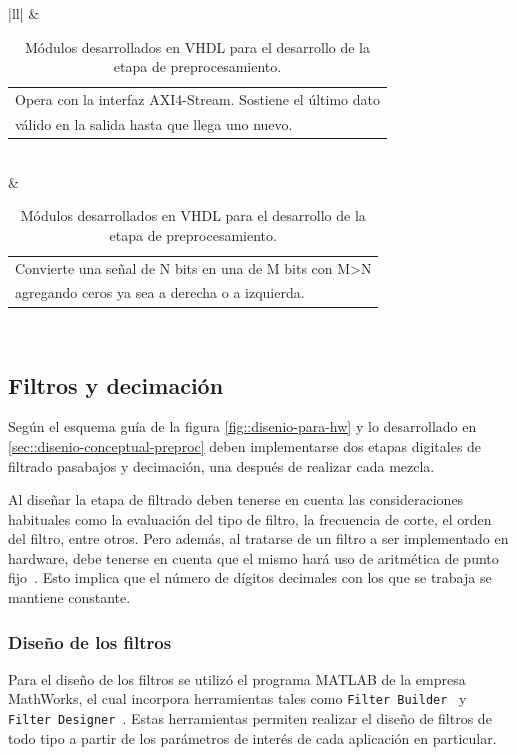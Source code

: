 \documentclass[../../main.tex]{subfiles}
\begin{document}
\begin{table}[H]
{\begin{tabular}{|ll|}
           & \begin{tabular}[c]{@{}l@{}}Opera con la interfaz AXI4-Stream. Sostiene el último dato\\ válido en la salida hasta que llega uno nuevo.\end{tabular}                                                                                                                                                                      \\ \hline
                                                           & \begin{tabular}[c]{@{}l@{}}Convierte una señal de N bits en una de M bits con M\textgreater{}N\\ agregando ceros ya sea a derecha o a izquierda.\end{tabular}                                                                                                                                                            \\ \hline
    \end{tabular}%
    }
    \caption{Módulos desarrollados en VHDL para el desarrollo de la etapa de preprocesamiento.}
    \label{tab::ip-fran}
    \end{table}

\subsection{Filtros y decimación}\label{subsec::filtros-decimacion}
Según el esquema guía de la figura \ref{fig::disenio-para-hw} y lo desarrollado en \ref{sec::disenio-conceptual-preproc} deben implementarse dos etapas digitales de filtrado pasabajos y decimación, una después de realizar cada mezcla. 

Al diseñar la etapa de filtrado deben tenerse en cuenta las consideraciones habituales como la evaluación del tipo de filtro, la frecuencia de corte, el orden del filtro, entre otros. Pero además, al tratarse de un filtro a ser implementado en hardware, debe tenerse en cuenta que el mismo hará uso de aritmética de punto fijo~\cite{pto-fijo}. Esto implica que el número de dígitos decimales con los que se trabaja se mantiene constante.

\subsubsection{Diseño de los filtros}
Para el diseño de los filtros se utilizó el programa MATLAB de la empresa MathWorks, el cual incorpora herramientas tales como \texttt{Filter Builder}~\cite{filter-builder} y \texttt{Filter Designer}~\cite{filter-designer}. Estas herramientas permiten realizar el diseño de filtros de todo tipo a partir de los parámetros de interés de cada aplicación en particular. 
\end{document}
